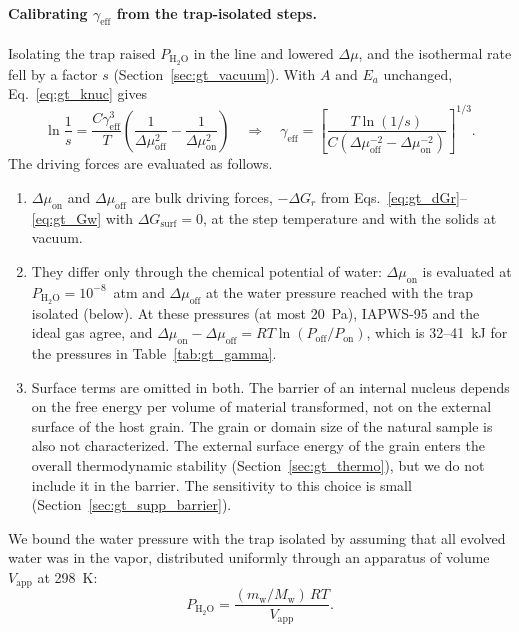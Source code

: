 \paragraph{Calibrating $\gamma_{\mathrm{eff}}$ from the trap-isolated steps.} Isolating the trap
raised $P_{\mathrm{H_2O}}$ in the line and lowered $\Delta\mu$, and the isothermal rate fell by a factor
$s$ (Section~\ref{sec:gt_vacuum}). With $A$ and $E_a$ unchanged, Eq.~\ref{eq:gt_knuc} gives
\begin{equation}
  \ln\frac{1}{s} = \frac{C\gamma_{\mathrm{eff}}^{3}}{T}\left(\frac{1}{\Delta\mu_{\mathrm{off}}^{2}} - \frac{1}{\Delta\mu_{\mathrm{on}}^{2}}\right)
  \quad\Longrightarrow\quad
  \gamma_{\mathrm{eff}} = \left[\frac{T\ln(1/s)}{C\left(\Delta\mu_{\mathrm{off}}^{-2} - \Delta\mu_{\mathrm{on}}^{-2}\right)}\right]^{1/3}.
  \label{eq:gt_gamma_cal}
\end{equation}
The driving forces are evaluated as follows.
\begin{enumerate}
  \item $\Delta\mu_{\mathrm{on}}$ and $\Delta\mu_{\mathrm{off}}$ are bulk driving forces,
  $-\Delta G_r$ from Eqs.~\ref{eq:gt_dGr}--\ref{eq:gt_Gw} with $\Delta G_{\mathrm{surf}} = 0$, at the
  step temperature and with the solids at vacuum.
  \item They differ only through the chemical potential of water: $\Delta\mu_{\mathrm{on}}$ is
  evaluated at $P_{\mathrm{H_2O}} = 10^{-8}$~atm and $\Delta\mu_{\mathrm{off}}$ at the water pressure
  reached with the trap isolated (below). At these pressures (at most 20~Pa), IAPWS-95 and the
  ideal gas agree, and
  $\Delta\mu_{\mathrm{on}} - \Delta\mu_{\mathrm{off}} = RT\ln(P_{\mathrm{off}}/P_{\mathrm{on}})$, which is
  32--41~kJ for the pressures in Table~\ref{tab:gt_gamma}.
  \item Surface terms are omitted in both. The barrier of an internal nucleus depends on the free
  energy per volume of material transformed, not on the external surface of the host grain. The
  grain or domain size of the natural sample is also not characterized. The external surface
  energy of the grain enters the overall thermodynamic stability (Section~\ref{sec:gt_thermo}),
  but we do not include it in the barrier. The sensitivity to this choice is small
  (Section~\ref{sec:gt_supp_barrier}).
\end{enumerate}
We bound the water pressure with the trap isolated by assuming that all evolved water was in the
vapor, distributed uniformly through an apparatus of volume $V_{\mathrm{app}}$ at 298~K:
\begin{equation}
  P_{\mathrm{H_2O}} = \frac{(m_{\mathrm{w}}/M_{\mathrm{w}})\,RT}{V_{\mathrm{app}}} .
\end{equation}

